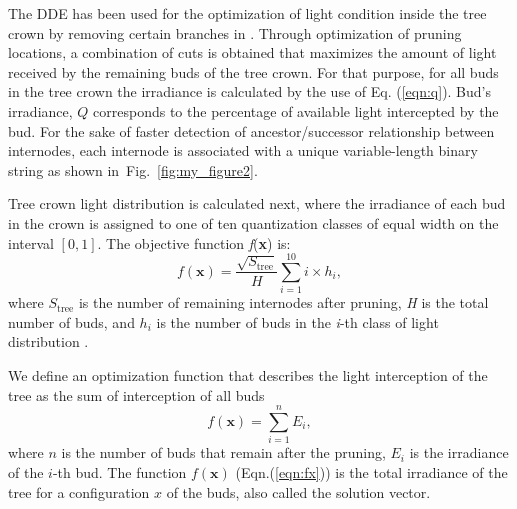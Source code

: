 The DDE has
been used for the optimization of light condition inside the tree crown
by removing certain branches in \cite{strnad_novel_2017}.
Through optimization of pruning locations, a combination of cuts is obtained
that maximizes the amount of light received by the remaining buds of the
tree crown. For that purpose, for all buds in the tree crown the
irradiance is calculated by the use of Eq. (\ref{eqn:q}). Bud's irradiance, \(Q\)
corresponds to the percentage of available light intercepted by the bud.
For the sake of faster detection of ancestor/successor relationship
between internodes, each internode is associated with a unique
variable-length binary string as shown in~Fig.~\ref{fig:my_figure2}. 

Tree crown light
distribution is calculated next, where the irradiance of each bud in the crown is assigned to one of ten quantization classes of equal width on
the interval $[0, 1]$. The objective function 
\emph{f}(\textbf{x}) is:
\begin{equation}
 f\left( \mathbf{x} \right) = \frac{\sqrt{S_{\mathrm{\text{tree}}}}}{H}\sum_{i = 1}^{10}{i \times h_{i}}, 
\end{equation}
where \(S_{\mathrm{\text{tree}}}\) is the number of remaining internodes
after pruning, \emph{H} is the total number of buds, and \(h_{i}\) is
the number of buds in the \emph{i}-th class of light distribution .

We define an optimization function that describes the light interception
of the tree as the sum of interception of all buds
\begin{equation}
   f\left( \mathbf{x} \right) = \sum_{i = 1}^{n}E_{i},\label{eqn:fx}
\end{equation}
where $n$ is the number of buds that remain after the pruning,
$E_{i}$ is the irradiance of the \(i\)-th bud. The function $f(\mathbf{x})$ (Eqn.(\ref{eqn:fx})) is the total irradiance of the tree for a configuration \(x\) of the buds,
also called the solution vector. 

